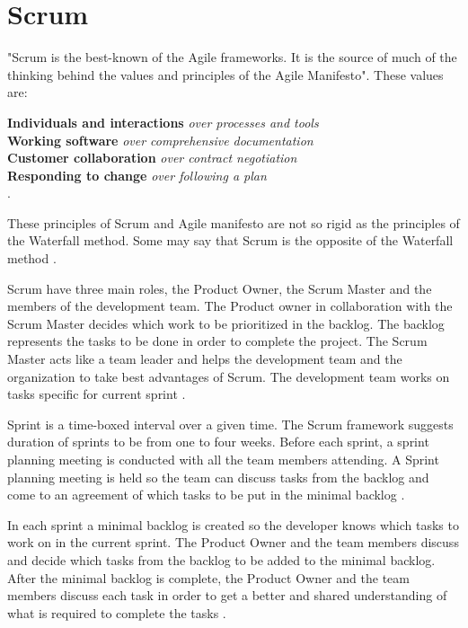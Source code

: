 \documentclass[UKenglish]{ifimaster}  %
\begin{document}
\section {Scrum}
\label{sec:Scrum}
"Scrum is the best-known of the Agile frameworks. It is the source of much of the thinking behind the values and principles of the Agile Manifesto". These values are:

\begin{center}
\textbf{Individuals and interactions}  \textit{over processes and tools} \\
\textbf{Working software} \textit{over comprehensive documentation} \\
\textbf{Customer collaboration} \textit{over contract negotiation} \\
\textbf{Responding to change} \textit{over following a plan} \\
\parencite{Scrum}.
\end{center}

These principles of Scrum and Agile manifesto are not so rigid as the principles of the Waterfall method. Some may say that Scrum is the opposite of the Waterfall method \parencite{cocco2011simulating}. 

Scrum have three main roles, the Product Owner, the Scrum Master and the members of the development team. The Product owner in collaboration with the Scrum Master decides which work to be prioritized in the backlog. The backlog represents the tasks to be done in order to complete the project. The Scrum Master acts like a team leader and helps the development team and the organization to take best advantages of Scrum. The development team works on tasks specific for current sprint \parencite{Scrum}.

Sprint is a time-boxed interval over a given time. The Scrum framework suggests duration of sprints to be from one to four weeks. Before each sprint, a sprint planning meeting is conducted with all the team members attending.  A Sprint planning meeting is held so the team can discuss tasks from the backlog and come to an agreement of which tasks to be put in the minimal backlog \parencite{Scrum}.

In each sprint a minimal backlog is created so the developer knows which tasks to work on in the current sprint. The Product Owner and the team members discuss and decide which tasks from the backlog to be added to the minimal backlog. After the minimal backlog is complete, the Product Owner and the team members discuss each task in order to get a better and shared understanding of what is required to complete the tasks \parencite{Scrum}. 
\end{document}
